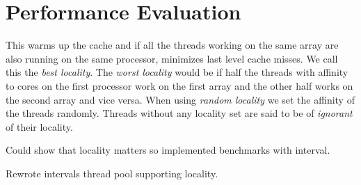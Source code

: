 \section{Performance Evaluation}


This warms up the cache and if all the threads working on the same
array are also running on the same processor, minimizes last level
cache misses. We call this the \emph{best locality}. The \emph{worst
  locality} would be if half the threads with affinity to cores on the
first processor work on the first array and the other half works on
the second array and vice versa. When using \emph{random locality} we
set the affinity of the threads randomly. Threads without any locality
set are said to be of \emph{ignorant} of their locality.


Could show that locality matters so implemented benchmarks with
interval.

Rewrote intervals thread pool supporting locality.


